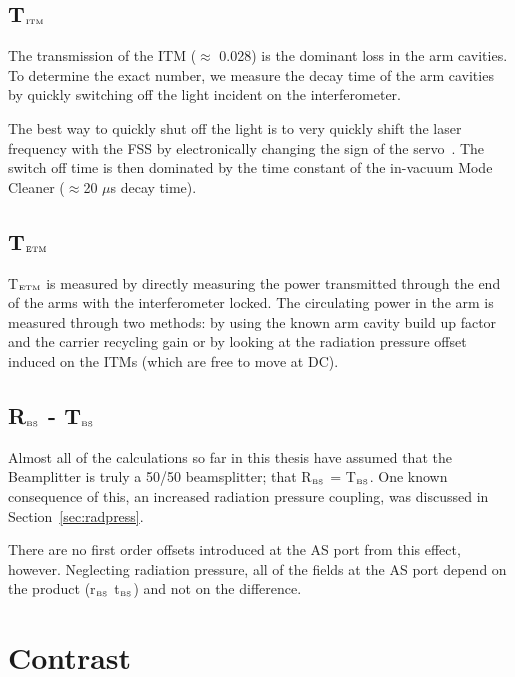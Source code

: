 \subsection{T$_{\mbox{\tiny ITM}}$}

The transmission of the ITM ($\approx$ 0.028) is the dominant loss in 
the arm cavities. To determine the exact number, we measure the decay
time of the arm cavities by quickly switching off the light incident
on the interferometer. 

The best way to quickly shut off the light is to very quickly shift
the laser frequency with the FSS by electronically changing the sign
of the servo~\cite{Andri:elog}. The switch off time is then dominated by the time
constant of the in-vacuum Mode Cleaner ($\approx$20 $\mu$s decay time). 



\subsection{T$_{\mbox{\tiny ETM}}$}

T$_{\mbox{\tiny ETM}}$ is measured by directly measuring the power
transmitted through the end of the arms with the interferometer
locked. The circulating power in the arm is measured through
two methods: by using the known arm cavity build up factor and
the carrier recycling gain or by looking at the radiation
pressure offset induced on the ITMs (which are free to move at DC).


\subsection{R$_{\mbox{\tiny BS}}$ - T$_{\mbox{\tiny BS}}$}

Almost all of the calculations so far in this thesis have assumed that the
Beamplitter is truly a 50/50 beamsplitter; that
R$_{\mbox{\tiny BS}}$ = T$_{\mbox{\tiny BS}}$. One known consequence of
this, an increased radiation pressure coupling, was discussed in
Section~\ref{sec:radpress}.

There are no first order offsets introduced at the AS port from this
effect, however. Neglecting radiation pressure, all of the fields at the
AS port depend on the product (r$_{\mbox{\tiny BS}}$ t$_{\mbox{\tiny BS}}$)
and not on the difference.

\section{Contrast}

